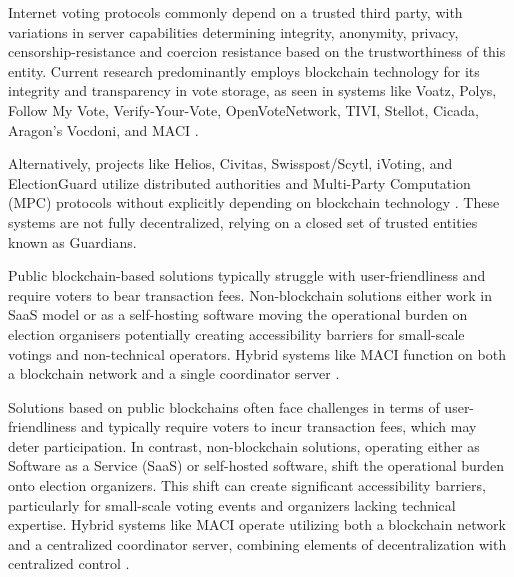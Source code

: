 \documentclass[runningheads]{llncs}
\begin{document}
Internet voting protocols commonly depend on a trusted third party, with variations in server capabilities determining integrity, anonymity, privacy, censorship-resistance and coercion resistance based on the trustworthiness of this entity. Current research predominantly employs blockchain technology for its integrity and transparency in vote storage, as seen in systems like Voatz, Polys, Follow My Vote, Verify-Your-Vote, OpenVoteNetwork, TIVI, Stellot, Cicada, Aragon's Vocdoni, and MACI \cite{mooreWestVirginiaMobile2019, PolysOnlineVoting, SecureDecentralizedApplication2023, chaiebVerifyYourVoteVerifiableBlockchainBased2019, haoAnonymousVotingTworound2010, mccorrySmartContractBoardroom2017, seifelnasrScalableOpenVoteNetwork2020, elsheikhDisputefreeScalableOpen2022, TIVIPoweredSmartmatic, NowYouCan2016, baranskiPracticalIVotingStellar2020, BuildingCicadaPrivate, A16zCicada2023, ethereumfoundationMinimalAntiCollusionInfrastructure2022, VocdoniIntroductionVocdoni, PrivacyscalingexplorationsMaci2023}.

Alternatively, projects like Helios, Civitas, Swisspost/Scytl, iVoting, and ElectionGuard utilize distributed authorities and Multi-Party Computation (MPC) protocols without explicitly depending on blockchain technology \cite{adidaHeliosWebbasedOpenAudit2008, clarksonCivitasSecureVoting2008, roenneJCJImprovedVerifiability2016, ElectionGuard}. These systems are not fully decentralized, relying on a closed set of trusted entities known as Guardians.

Public blockchain-based solutions typically struggle with user-friendliness and require voters to bear transaction fees. Non-blockchain solutions either work in SaaS model or as a self-hosting software moving the operational burden on election organisers potentially creating accessibility barriers for small-scale votings and non-technical operators. Hybrid systems like MACI function on both a blockchain network and a single coordinator server \cite{ethereumfoundationMinimalAntiCollusionInfrastructure2022, PrivacyscalingexplorationsMaci2023}.

Solutions based on public blockchains often face challenges in terms of user-friendliness and typically require voters to incur transaction fees, which may deter participation. In contrast, non-blockchain solutions, operating either as Software as a Service (SaaS) or self-hosted software, shift the operational burden onto election organizers. This shift can create significant accessibility barriers, particularly for small-scale voting events and organizers lacking technical expertise. Hybrid systems like MACI operate utilizing both a blockchain network and a centralized coordinator server, combining elements of decentralization with centralized control \cite{ethereumfoundationMinimalAntiCollusionInfrastructure2022, PrivacyscalingexplorationsMaci2023}.
\end{document}
